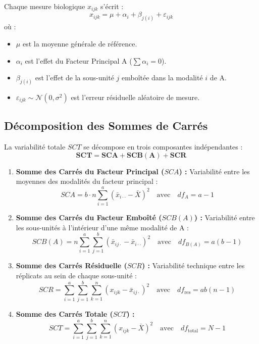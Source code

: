 \documentclass[11pt,a4paper]{article}
\begin{document}
Chaque mesure biologique $x_{ijk}$ s'écrit :
\begin{equation*}
x_{ijk} = \mu + \alpha_i + \beta_{j(i)} + \varepsilon_{ijk}
\end{equation*}
où :
\begin{itemize}[leftmargin=*, label=\faCircle]
  \item $\mu$ est la moyenne générale de référence.
  \item $\alpha_i$ est l'effet du Facteur Principal A ($\sum \alpha_i = 0$).
  \item $\beta_{j(i)}$ est l'effet de la sous-unité $j$ emboîtée dans la modalité $i$ de A.
  \item $\varepsilon_{ijk} \sim \mathcal{N}(0, \sigma^2)$ est l'erreur résiduelle aléatoire de mesure.
\end{itemize}

\subsection{Décomposition des Sommes de Carrés}
La variabilité totale $SCT$ se décompose en trois composantes indépendantes :
\begin{equation*}
\mathbf{SCT = SCA + SCB(A) + SCR}
\end{equation*}

\begin{enumerate}[leftmargin=*, label=\faCalculator\ \textbf{\arabic*.}]
  \item \textbf{Somme des Carrés du Facteur Principal ($SCA$) :}
  Variabilité entre les moyennes des modalités du facteur principal :
  \begin{equation*}
    SCA = b \cdot n \sum_{i=1}^a (\bar{x}_{i\cdot\cdot} - \bar{X})^2 \quad \text{avec} \quad df_A = a - 1
  \end{equation*}
  \item \textbf{Somme des Carrés du Facteur Emboîté ($SCB(A)$) :}
  Variabilité entre les sous-unités à l'intérieur d'une même modalité de A :
  \begin{equation*}
    SCB(A) = n \sum_{i=1}^a \sum_{j=1}^b (\bar{x}_{ij\cdot} - \bar{x}_{i\cdot\cdot})^2 \quad \text{avec} \quad df_{B(A)} = a(b - 1)
  \end{equation*}
  \item \textbf{Somme des Carrés Résiduelle ($SCR$) :}
  Variabilité technique entre les réplicats au sein de chaque sous-unité :
  \begin{equation*}
    SCR = \sum_{i=1}^a \sum_{j=1}^b \sum_{k=1}^n (x_{ijk} - \bar{x}_{ij\cdot})^2 \quad \text{avec} \quad df_{\text{res}} = ab(n - 1)
  \end{equation*}
  \item \textbf{Somme des Carrés Totale ($SCT$) :}
  \begin{equation*}
    SCT = \sum_{i=1}^a \sum_{j=1}^b \sum_{k=1}^n (x_{ijk} - \bar{X})^2 \quad \text{avec} \quad df_{\text{total}} = N - 1
  \end{equation*}
\end{enumerate}
\end{document}
